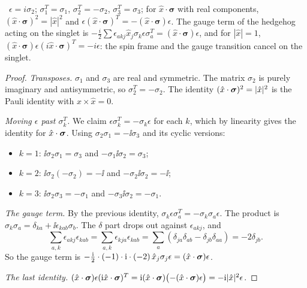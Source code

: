 \begin{proposition}\label{prop:twistmatrices}\ver\
$\epsilon=i\sigma_2$; $\sigma_1^T=\sigma_1$, $\sigma_2^T=-\sigma_2$, $\sigma_3^T=\sigma_3$; for $\hat x\cdot\boldsymbol\sigma$ with real components, $(\hat x\cdot\boldsymbol\sigma)^2=|\hat x|^2$ and $\epsilon(\hat x\cdot\boldsymbol\sigma)^T=-(\hat x\cdot\boldsymbol\sigma)\epsilon$. The gauge term of the hedgehog acting on the singlet is $-\frac i2\sum\epsilon_{akj}\hat x_j\sigma_k\epsilon\sigma_a^T=(\hat x\cdot\boldsymbol\sigma)\epsilon$, and for $|\hat x|=1$, $(\hat x\cdot\boldsymbol\sigma)\epsilon(i\hat x\cdot\boldsymbol\sigma)^T=-i\epsilon$: the spin frame and the gauge transition cancel on the singlet.
\end{proposition}
\begin{proof}
\emph{Transposes.} $\sigma_1$ and $\sigma_3$ are real and symmetric. The matrix $\sigma_2$ is purely imaginary and antisymmetric, so $\sigma_2^T=-\sigma_2$. The identity $(\hat x\cdot\boldsymbol{\sigma})^2=|\hat x|^2$ is the Pauli identity with $\hat x\times\hat x=0$.

\emph{Moving $\epsilon$ past $\sigma_k^T$.} We claim $\epsilon\sigma_k^T=-\sigma_k\epsilon$ for each $k$, which by linearity gives the identity for $\hat x\cdot\boldsymbol{\sigma}$. Using $\sigma_2\sigma_1=-\ii\sigma_3$ and its cyclic versions:
\begin{itemize}[nosep]
\item $k=1$: $\ii\sigma_2\sigma_1=\sigma_3$ and $-\sigma_1\ii\sigma_2=\sigma_3$;
\item $k=2$: $\ii\sigma_2(-\sigma_2)=-\ii$ and $-\sigma_2\ii\sigma_2=-\ii$;
\item $k=3$: $\ii\sigma_2\sigma_3=-\sigma_1$ and $-\sigma_3\ii\sigma_2=-\sigma_1$.
\end{itemize}

\emph{The gauge term.} By the previous identity, $\sigma_k\epsilon\sigma_a^T=-\sigma_k\sigma_a\epsilon$. The product is $\sigma_k\sigma_a=\delta_{ka}+\ii\epsilon_{kab}\sigma_b$. The $\delta$ part drops out against $\epsilon_{akj}$, and
\[
\sum_{a,k}\epsilon_{akj}\epsilon_{kab}=\sum_{a,k}\epsilon_{kja}\epsilon_{kab}=\sum_a(\delta_{ja}\delta_{ab}-\delta_{jb}\delta_{aa})=-2\delta_{jb}.
\]
So the gauge term is $-\frac{\mathrm{i}}2\cdot(-1)\cdot\mathrm{i}\cdot(-2)\,\hat x_j\sigma_j\epsilon=(\hat x\cdot\boldsymbol{\sigma})\epsilon$.

\emph{The last identity.} $(\hat x\cdot\boldsymbol{\sigma})\epsilon(\mathrm{i}\hat x\cdot\boldsymbol{\sigma})^T=\mathrm{i}(\hat x\cdot\boldsymbol{\sigma})\bigl(-(\hat x\cdot\boldsymbol{\sigma})\epsilon\bigr)=-\mathrm{i}|\hat x|^2\epsilon$.
\end{proof}


